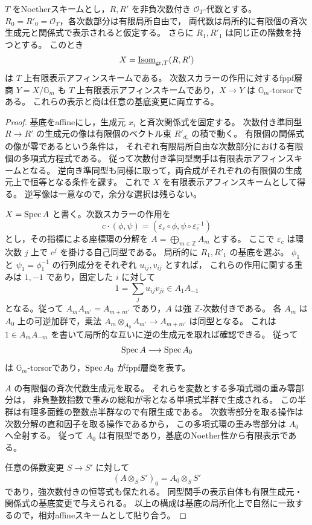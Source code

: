 \begin{lemma}\label{lem:graded-isom-affine-quotient}
$T$ をNoetherスキームとし，$R,R'$ を非負次数付き $\mathcal O_T$-代数とする。
$R_0=R'_0=\mathcal O_T$，各次数部分は有限局所自由で，
両代数は局所的に有限個の斉次生成元と関係式で表示されると仮定する。
さらに $R_1,R'_1$ は同じ正の階数を持つとする。
このとき
\[
 X=\underline{\operatorname{Isom}}_{\mathrm{gr},T}(R,R')
\]
は $T$ 上有限表示アフィンスキームである。
次数スカラーの作用に対するfppf層商 $Y=X/\mathbb G_m$ も
$T$ 上有限表示アフィンスキームであり，$X\to Y$ は $\mathbb G_m$-torsorである。
これらの表示と商は任意の基底変更に両立する。
\end{lemma}
\begin{proof}
基底をaffineにし，生成元 $x_i$ と斉次関係式を固定する。
次数付き準同型 $R\to R'$ の生成元の像は有限個のベクトル束 $R'_{d_i}$ の積で動く。
有限個の関係式の像が零であるという条件は，
それぞれ有限局所自由な次数部分における有限個の多項式方程式である。
従って次数付き準同型関手は有限表示アフィンスキームとなる。
逆向き準同型も同様に取って，両合成がそれぞれの有限個の生成元上で恒等となる条件を課す。
これで $X$ を有限表示アフィンスキームとして得る。
逆写像は一意なので，余分な選択は残らない。

$X=\operatorname{Spec} A$ と書く。次数スカラーの作用を
\[
 c\cdot(\phi,\psi)
   =(\varepsilon_c\circ\phi,\psi\circ\varepsilon_c^{-1})
\]
とし，その指標による座標環の分解を $A=\bigoplus_{m\in\mathbb Z}A_m$ とする。
ここで $\varepsilon_c$ は環次数 $j$ 上で $c^j$ を掛ける自己同型である。
局所的に $R_1,R'_1$ の基底を選ぶ。
$\phi_1$ と $\psi_1=\phi_1^{-1}$ の行列成分をそれぞれ $u_{ij},v_{ij}$ とすれば，
これらの作用に関する重みは $1,-1$ であり，固定した $i$ に対して
\[
  1=\sum_j u_{ij}v_{ji}\in A_1A_{-1}
\]
となる。従って $A_mA_{m'}=A_{m+m'}$ であり，$A$ は強 $\mathbb Z$-次数付きである。
各 $A_m$ は $A_0$ 上の可逆加群で，乗法 $A_m\otimes_{A_0}A_{m'}\to A_{m+m'}$ は同型となる。
これは $1\in A_mA_{-m}$ を書いて局所的な互いに逆の生成元を取れば確認できる。
従って
\[
  \operatorname{Spec} A\longrightarrow\operatorname{Spec} A_0
\]
は $\mathbb G_m$-torsorであり，$\operatorname{Spec} A_0$ がfppf層商を表す。

$A$ の有限個の斉次代数生成元を取る。
それらを変数とする多項式環の重み零部分は，
非負整数指数で重みの総和が零となる単項式半群で生成される。
この半群は有理多面錐の整数点半群なので有限生成である。
次数零部分を取る操作は次数分解の直和因子を取る操作であるから，
この多項式環の重み零部分は $A_0$ へ全射する。
従って $A_0$ は有限型であり，基底のNoether性から有限表示である。

任意の係数変更 $S\to S'$ に対して
\[
  (A\otimes_S S')_0=A_0\otimes_S S'
\]
であり，強次数付きの恒等式も保たれる。
同型関手の表示自体も有限生成元・関係式の基底変更で与えられる。
以上の構成は基底の局所化上で自然に一致するので，相対affineスキームとして貼り合う。
\end{proof}

